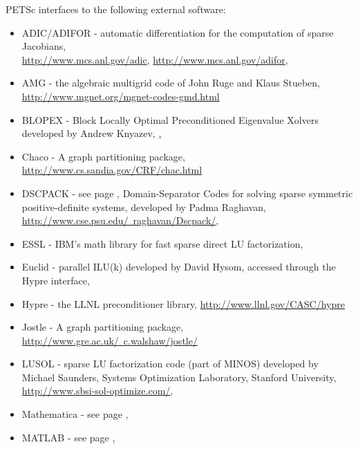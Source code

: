 \vspace{.3in}
\noindent
PETSc interfaces to the following external software:
\begin{itemize}
  \item ADIC/ADIFOR -  automatic differentiation for the computation of sparse Jacobians,\\ 
                     \href{http://www.mcs.anl.gov/adic}{http://www.mcs.anl.gov/adic},
                     \href{http://www.mcs.anl.gov/adifor}{http://www.mcs.anl.gov/adifor},
  \item AMG -         the algebraic multigrid code of John Ruge and Klaus Stueben,
                     \href{http://www.mgnet.org/mgnet-codes-gmd.html}{http://www.mgnet.org/mgnet-codes-gmd.html}
  \item BLOPEX - Block Locally Optimal Preconditioned Eigenvalue Xolvers developed by Andrew Knyazev,
                    \href{http://www-math.cudenver.edu/~aknyazev/software/BLOPEX/},
  \item Chaco -     A graph partitioning package, \href{ http://www.cs.sandia.gov/CRF/chac.html}{ http://www.cs.sandia.gov/CRF/chac.html}
  \item DSCPACK -    see page \pageref{sec_externalsol}, Domain-Separator Codes for solving sparse symmetric
                      positive-definite systems, 
                     developed by Padma Raghavan,   
                     \href{http://www.cse.psu.edu/~raghavan/Dscpack/}{http://www.cse.psu.edu/~raghavan/Dscpack/},
  \item ESSL -         IBM's math library for fast sparse direct LU factorization,
  \item Euclid  -   parallel ILU(k) developed by David Hysom, accessed through the Hypre interface,
  \item Hypre -    the LLNL preconditioner library, \href{http://www.llnl.gov/CASC/hypre}{http://www.llnl.gov/CASC/hypre}
  \item Jostle -     A graph partitioning package, \href{http://www.gre.ac.uk/~c.walshaw/jostle/}{http://www.gre.ac.uk/~c.walshaw/jostle/}
  \item LUSOL -       sparse LU factorization code (part of MINOS) developed by Michael Saunders,
                      Systems Optimization Laboratory, Stanford University,
                     \href{http://www.sbsi-sol-optimize.com/}{http://www.sbsi-sol-optimize.com/},
  \item Mathematica -  see page \pageref{ch_mathematica},
  \item MATLAB -      see page \pageref{ch_matlab},

\end{itemize}

